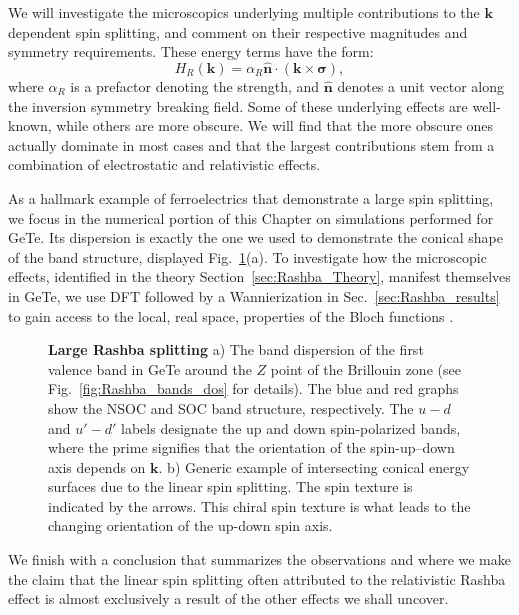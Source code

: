 We will investigate the microscopics underlying multiple contributions to the $\bm{k}$ dependent spin splitting, and comment on their respective magnitudes and symmetry requirements. 
These energy terms have the form:
\begin{equation}
	\label{eq:Rashba_form}
	H_R(\bm{k}) = \alpha_R \hat{\bm{n}} \cdot (\bm{k} \times \bm \sigma),
\end{equation}
where $\alpha_R$ is a prefactor denoting the strength, and $\hat{\bm n}$ denotes a unit vector along the inversion symmetry breaking field.
Some of these underlying effects are well-known, while others are more obscure.
We will find that the more obscure ones actually dominate in most cases and that the largest contributions stem from a combination of electrostatic and relativistic effects.

As a hallmark example of ferroelectrics that demonstrate a large spin splitting, we focus in the numerical portion of this Chapter on simulations performed for GeTe.
Its dispersion is exactly the one we used to demonstrate the conical shape of the band structure, displayed Fig.~\ref{fig:Rashba_intro_dispersion}(a).
To investigate how the microscopic effects, identified in the theory Section~\ref{sec:Rashba_Theory}, manifest themselves in GeTe, we use \gls{DFT} followed by a Wannierization in Sec.~\ref{sec:Rashba_results} to gain access to the local, real space, properties of the Bloch functions .
\begin{figure}[h]
	\caption{\label{fig:Rashba_intro_dispersion}
		{\bf Large Rashba splitting} a) The band dispersion of the first valence band in GeTe around the $Z$ point of the Brillouin zone (see Fig.~\ref{fig:Rashba_bands_dos} for details). The blue and red graphs show the \gls{NSOC} and \gls{SOC} band structure, respectively. The $u-d$ and $u'-d'$ labels designate the up and down spin-polarized bands, where the prime signifies that the orientation of the spin-up--down axis depends on $\bm{k}$. b) Generic example of intersecting conical energy surfaces due to the linear spin splitting. The spin texture is indicated by the arrows. This chiral spin texture is what leads to the changing orientation of the up-down spin axis.}
\end{figure}

We finish with a conclusion that summarizes the observations and where we make the claim that the linear spin splitting often attributed to the relativistic Rashba effect is almost exclusively a result of the other effects we shall uncover.

